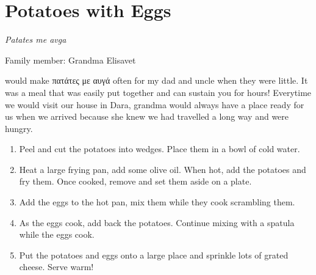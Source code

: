 \chapter{Potatoes with Eggs}
\label{ch:eggswithpotatoes}


\textit{Patates me avga}

Family member: Grandma Elisavet

 would make \textgreek{πατάτες με αυγά} often for my dad and uncle when they were little. It was a meal that was easily put together and can sustain you for hours! Everytime we would visit our house in Dara, grandma would always have a place ready for us when we arrived because she knew we had travelled a long way and were hungry.

\begin{enumerate}
    \item Peel and cut the potatoes into wedges. Place them in a bowl of cold water.
    \item Heat a large frying pan, add some olive oil. When hot, add the potatoes and fry them. Once cooked, remove and set them aside on a plate.
    \item Add the eggs to the hot pan, mix them while they cook scrambling them.
    \item As the eggs cook, add back the potatoes. Continue mixing with a spatula while the eggs cook.
    \item Put the potatoes and eggs onto a large place and sprinkle lots of grated cheese. Serve warm!
\end{enumerate}


